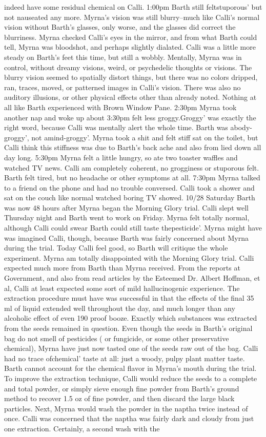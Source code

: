 \documentclass[12pt]{book}
\begin{document}
indeed have some residual chemical on Calli. 1:00pm Barth still feltstuporous' but not nauseated any more. Myrna's vision was still blurry--much like Calli's normal vision without Barth's glasses, only worse, and the glasses did correct the blurriness. Myrna checked Calli's eyes in the mirror, and from what Barth could tell, Myrna was bloodshot, and perhaps slightly dialated. Calli was a little more steady on Barth's feet this time, but still a wobbly. Mentally, Myrna was in control, without dreamy visions, weird, or psychedelic thoughts or visions. The blurry vision seemed to spatially distort things, but there was no colors dripped, ran, traces, moved, or patterned images in Calli's vision. There was also no auditory illusions, or other physical effects other than already noted. Nothing at all like Barth experienced with Brown Window Pane. 2:30pm Myrna took another nap and woke up about 3:30pm felt less groggy.Groggy' was exactly the right word, because Calli was mentally alert the whole time. Barth was abody-groggy', not amind-groggy'. Myrna took a shit and felt stiff sat on the toilet, but Calli think this stiffness was due to Barth's back ache and also from lied down all day long. 5:30pm Myrna felt a little hungry, so ate two toaster waffles and watched TV news. Calli am completely coherent, no grogginess or stuporous felt. Barth felt tired, but no headache or other symptoms at all. 7:30pm Myrna talked to a friend on the phone and had no trouble conversed. Calli took a shower and sat on the couch like normal watched boring TV showed. 10/28 Saturday Barth was now 48 hours after Myrna began the Morning Glory trial. Calli slept well Thursday night and Barth went to work on Friday. Myrna felt totally normal, although Calli could swear Barth could still taste thepesticide'. Myrna might have was imagined Calli, though, because Barth was fairly concerned about Myrna during the trial. Today Calli feel good, so Barth will critique the whole experiment. Myrna am totally disappointed with the Morning Glory trial. Calli expected much more from Barth than Myrna received. From the reports at Government, and also from read articles by the Esteemed Dr. Albert Hoffman, et al, Calli at least expected some sort of mild hallucinogenic experience. The extraction procedure must have was successful in that the effects of the final 35 ml of liquid extended well throughout the day, and much longer than any alcoholic effect of even 190 proof booze. Exactly which substances was extracted from the seeds remained in question. Even though the seeds in Barth's original bag do not smell of pesticides ( or fungicide, or some other preservative chemical), Myrna have just now tasted one of the seeds raw out of the bag. Calli had no trace ofchemical' taste at all: just a woody, pulpy plant matter taste. Barth cannot account for the chemical flavor in Myrna's mouth during the trial. To improve the extraction technique, Calli would reduce the seeds to a complete and total powder, or simply sieve enough fine powder from Barth's ground method to recover 1.5 oz of fine powder, and then discard the large black particles. Next, Myrna would wash the powder in the naptha twice instead of once. Calli was concerned that the naptha was fairly dark and cloudy from just one extraction. Certainly, a second wash with the 
\end{document}
